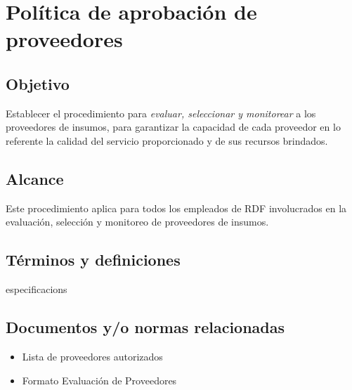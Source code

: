 \thispagestyle{formato-PI}
\renewcommand{\MayorVer}{2}
\renewcommand{\MenorVer}{0}
\renewcommand{\Codigo}{PSA-1-PROG} %
\renewcommand{\FechaPub}{2023--01}
\renewcommand{\Titulo}{Política de aprobación de proveedores}

\section{\Titulo}


\subsection{Objetivo}

Establecer el procedimiento para \emph{evaluar, seleccionar y monitorear} a los proveedores de insumos, para garantizar la capacidad de cada proveedor en lo referente la calidad del servicio proporcionado y de sus recursos brindados.

\subsection{Alcance}

Este procedimiento aplica para todos los empleados de \gls{RDF} involucrados en la evaluación, selección y monitoreo de proveedores de insumos.

\subsection{Términos y definiciones}
\begin{description}
    \glspl{especificacion}
\end{description}
\subsection{Documentos y/o normas relacionadas}

\begin{itemize}
    \item Lista de proveedores autorizados
    \item Formato Evaluación de Proveedores
\end{itemize}

